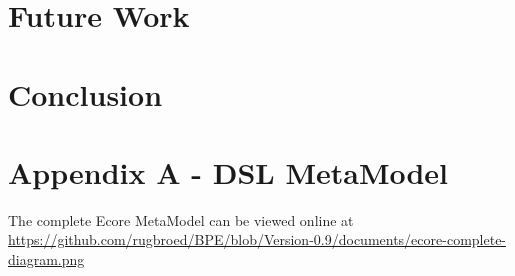 \documentclass{"The Road to a Building Automation DSL through MDD"}
\begin{document}
\section{Future Work}\label{sec:futureWork}


\section{Conclusion}\label{sec:conclusion}


{}


\section*{Appendix A - DSL MetaModel}\label{app:a-metamodel}
The complete Ecore MetaModel can be viewed online at
\url{https://github.com/rugbroed/BPE/blob/Version-0.9/documents/ecore-complete-diagram.png}





\end{document}
